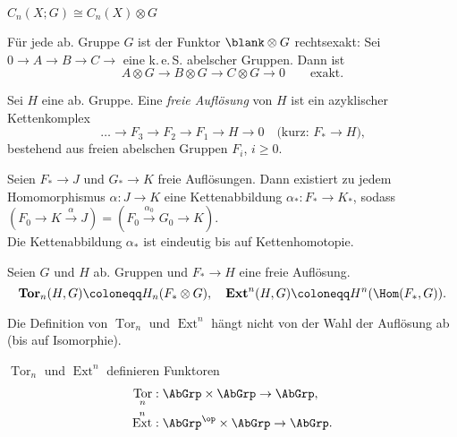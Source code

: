 \documentclass{cheat-sheet}
\DeclareMathOperator{\Tor}{Tor}
\DeclareMathOperator{\Ext}{Ext}
\newcommand{\keS}{k.\,e.\,S.} %
\begin{document}

\begin{bem}
  $C_n(X; G) \cong C_n(X) \otimes G$
\end{bem}


\begin{prop}
  Für jede ab. Gruppe $G$ ist der Funktor $\blank \otimes G$ rechtsexakt:
  Sei $0 \to A \to B \to C \to$ eine \keS{} abelscher Gruppen. Dann ist
  \[
    A \otimes G \to B \otimes G \to C \otimes G \to 0
    \qquad \text{exakt.}
  \]
\end{prop}

\begin{defn}
  Sei $H$ eine ab. Gruppe. Eine \emph{freie Auflösung} von $H$ ist ein azyklischer Kettenkomplex
  \[
    \ldots \to F_3 \to F_2\to F_1 \to H \to 0
    \quad \text{(kurz: $F_* \to H$),}
  \]
  bestehend aus freien abelschen Gruppen $F_i$, $i \geq 0$.
\end{defn}

\begin{prop}
  Seien $F_* \to J$ und $G_* \to K$ freie Auflösungen. Dann existiert zu jedem Homomorphismus $\alpha : J \to K$ eine Kettenabbildung $\alpha_* : F_* \to K_*$, sodass
  $(F_0 \to K \xrightarrow{\alpha} J) = (F_0 \xrightarrow{\alpha_0} G_0 \to K)$.\\
  Die Kettenabbildung $\alpha_*$ ist eindeutig bis auf Kettenhomotopie.
\end{prop}

\begin{defn}
  Seien $G$ und $H$ ab. Gruppen und $F_* \to H$ eine freie Auflösung.
  \[
    \text{\emph{$\mathrm{\mathbf{Tor}}_n$}}(H, G) \coloneqq H_n(F_* \otimes G), \quad
    \text{\emph{$\mathrm{\mathbf{Ext}}^n$}}(H, G) \coloneqq H^n(\Hom(F_*, G)).
  \]
\end{defn}

\begin{prop}
  Die Definition von $\Tor_n$ und $\Ext^n$ hängt nicht von der Wahl der Auflösung ab (bis auf Isomorphie).
\end{prop}

\begin{prop}
  $\Tor_n$ und $\Ext^n$ definieren Funktoren
  \begin{align*}
    \Tor_n &: \AbGrp \times \AbGrp \to \AbGrp, \\
    \Ext^n &: \AbGrp^\op \times \AbGrp \to \AbGrp.
  \end{align*}
\end{prop}
\end{document}
